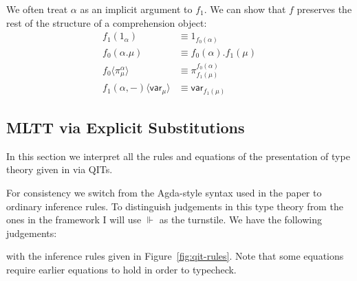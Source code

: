 \documentclass[10pt]{article}
\theoremstyle{definition}
\newcommand{\CTX}{\,\,\mathsf{Ctx}}
\newcommand{\TYPE}{\,\,\mathsf{Type}}
\newcommand\ap[2]{\ensuremath{#1 \langle #2 \rangle }}
\begin{document}
We often treat $\alpha$ as an implicit argument to $f_1$.   We can show
that $f$ preserves the rest of the structure of a comprehension object:
\begin{align}
\label{mor-one}
f_1(1_\alpha) &\equiv 1_{f_0(\alpha)} \\
\label{mor-dot}
f_0(\alpha.\mu) &\equiv f_0(\alpha).f_1(\mu) \\
\label{mor-pi}
\ap{f_0}{\pi^\alpha_\mu} &\equiv \pi^{f_0(\alpha)}_{f_1(\mu)} \\
\label{mor-var}
\ap{f_1(\alpha,-)}{\mathsf{var}_\mu} &\equiv \mathsf{var}_{f_1(\mu)}
\end{align}
  
\subsection{MLTT via Explicit Substitutions}
\newcommand{\qyields}{\Vdash}
\newcommand{\varsof}[1]{{#1}^\dagger}
\newcommand{\upstairs}[1]{\overline{#1}}
\newcommand{\downstairs}[1]{\underline{#1}}
\newcommand{\asdep}[1]{{#1}_p}

In this section we interpret all the rules and equations of the presentation of type theory given in \cite{altenkirchkaposi16qit} via QITs. 

For consistency we switch from the Agda-style syntax used in the paper to ordinary inference rules. To distinguish judgements in this type theory from the ones in the framework I will use $\qyields$ as the turnstile.  We have the following judgements:
with the inference rules given in Figure~\ref{fig:qit-rules}. Note that some equations require earlier equations to hold in order to typecheck.
\end{document}
